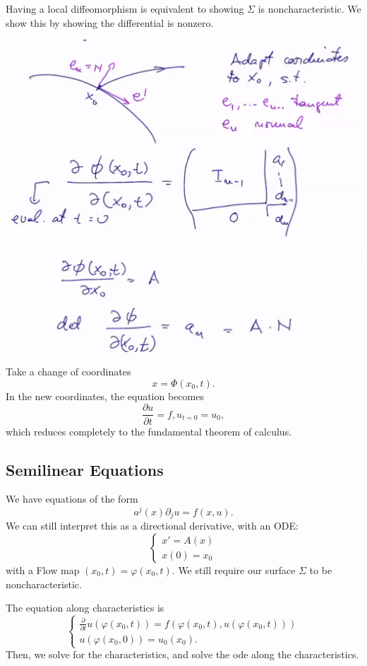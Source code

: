 \documentclass[11pt]{scrartcl}
\let \phi \varphi
\begin{document}
Having a local diffeomorphism is equivalent to showing $\Sigma$ is noncharacteristic.  We show this by showing the differential is nonzero.
 \begin{center}
\includegraphics[scale=0.6]{diffe.png}
\end{center}
Take a change of coordinates 
$$x = \Phi(x_0, t).$$
In the new coordinates, the equation becomes
$$\frac{\partial u}{\partial t} = f, u_{t=0} = u_0,$$
which reduces completely to the fundamental theorem of calculus.
\subsection{Semilinear Equations}
We have equations of the form
$$a^j(x) \partial_j u = f(x, u).$$
We can still interpret this as a directional derivative, with an ODE:
$$\begin{cases}
x' = A(x)\\
x(0) = x_0
\end{cases}$$
with a Flow map $(x_0, t) = \phi(x_0, t)$.  We still require our surface $\Sigma$ to be noncharacteristic.

The equation along characteristics is
$$\begin{cases}
\frac{\partial}{\partial t} u (\phi(x_0, t)) = f(\phi(x_0, t), u(\phi(x_0, t)))\\
u(\phi(x_0, 0)) = u_0(x_0).
\end{cases}
$$
Then, we solve for the characteristics, and solve the ode along the characteristics.  
\end{document}
